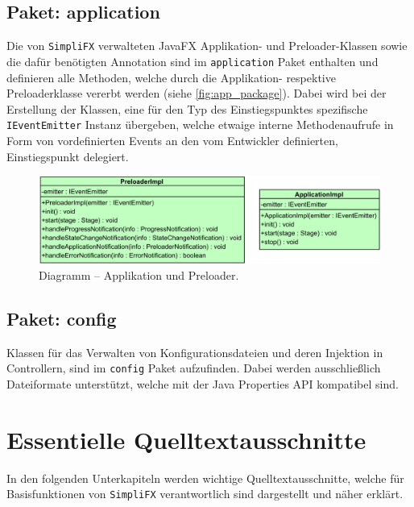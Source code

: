 \subsection{Paket: application}
Die von \texttt{SimpliFX} verwalteten JavaFX Applikation- und Preloader-Klassen sowie die dafür benötigten Annotation sind im \texttt{application} Paket enthalten und definieren alle Methoden, welche durch die Applikation- respektive Preloaderklasse vererbt werden (siehe \autoref{fig:app_package}). Dabei wird bei der Erstellung der Klassen, eine für den Typ des Einstiegspunktes spezifische \texttt{IEventEmitter} Instanz übergeben, welche etwaige interne Methodenaufrufe in Form von vordefinierten Events an den vom Entwickler definierten, Einstiegspunkt delegiert.
\begin{figure}[H]
	\centering
	\includegraphics[width=\textwidth-2cm]{Abbildungen/Applikation und Preloader.png}
	\caption{Diagramm -- Applikation und Preloader.}
	\label{fig:app_package}
\end{figure}
\subsection{Paket: config}
Klassen für das Verwalten von Konfigurationsdateien und deren Injektion in Controllern, sind im \texttt{config} Paket aufzufinden. Dabei werden ausschließlich Dateiformate unterstützt, welche mit der Java Properties API kompatibel sind.
\section{Essentielle Quelltextausschnitte}
In den folgenden Unterkapiteln werden wichtige Quelltextausschnitte, welche für Basisfunktionen von \texttt{SimpliFX} verantwortlich sind dargestellt und näher erklärt.
